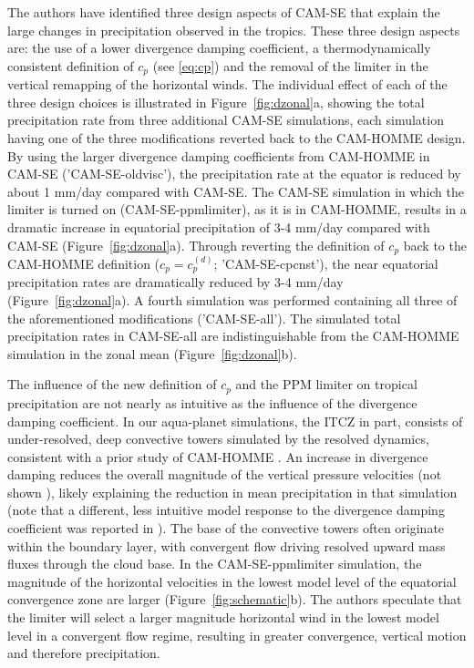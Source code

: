 \documentclass{agujournal}
\begin{document}
The authors have identified three design aspects of CAM-SE that explain the large changes in precipitation observed in the tropics. These three design aspects are: the use of a lower divergence damping coefficient, a thermodynamically consistent definition of $c_p$ (see \eqref{eq:cp}) and the removal of the limiter in the vertical remapping of the horizontal winds. The individual effect of each of the three design choices is illustrated in Figure~\ref{fig:dzonal}a, showing the total precipitation rate from three additional CAM-SE simulations, each simulation having one of the three modifications reverted back to the CAM-HOMME design. By using the larger divergence damping coefficients from CAM-HOMME in CAM-SE ('CAM-SE-oldvisc'), the precipitation rate at the equator is reduced by about 1 mm/day compared with CAM-SE. The CAM-SE simulation in which the limiter is turned on (CAM-SE-ppmlimiter), as it is in CAM-HOMME, results in a dramatic increase in equatorial precipitation of 3-4 mm/day compared with CAM-SE (Figure~\ref{fig:dzonal}a). Through reverting the definition of $c_p$ back to the CAM-HOMME definition ($c_p = c_p^{(d)}$; 'CAM-SE-cpcnst'), the near equatorial precipitation rates are dramatically reduced by 3-4 mm/day (Figure~\ref{fig:dzonal}a). A fourth simulation was performed containing all three of the aforementioned modifications ('CAM-SE-all'). The simulated total precipitation rates in CAM-SE-all are indistinguishable from the CAM-HOMME simulation in the zonal mean (Figure~\ref{fig:dzonal}b).

The influence of the new definition of $c_p$ and the PPM limiter on tropical precipitation are not nearly as intuitive as the influence of the divergence damping coefficient. In our aqua-planet simulations, the ITCZ in part, consists of under-resolved, deep convective towers simulated by the resolved dynamics, consistent with a prior study of CAM-HOMME \citep{HR2017JCLIM}. An increase in divergence damping reduces the overall magnitude of the vertical pressure velocities (not shown {\color{red}{maybe include the pdf?}}), likely explaining the reduction in mean precipitation in that simulation (note that a different, less intuitive model response to the divergence damping coefficient was reported in \cite{ZHL2012JAS}). The base of the convective towers often originate within the boundary layer, with convergent flow driving resolved upward mass fluxes through the cloud base. In the CAM-SE-ppmlimiter simulation, the magnitude of the horizontal velocities in the lowest model level of the equatorial convergence zone are larger (Figure~\ref{fig:schematic}b). The authors speculate that the limiter will select a larger magnitude horizontal wind in the lowest model level in a convergent flow regime, resulting in greater convergence, vertical motion and therefore precipitation.
\end{document}
